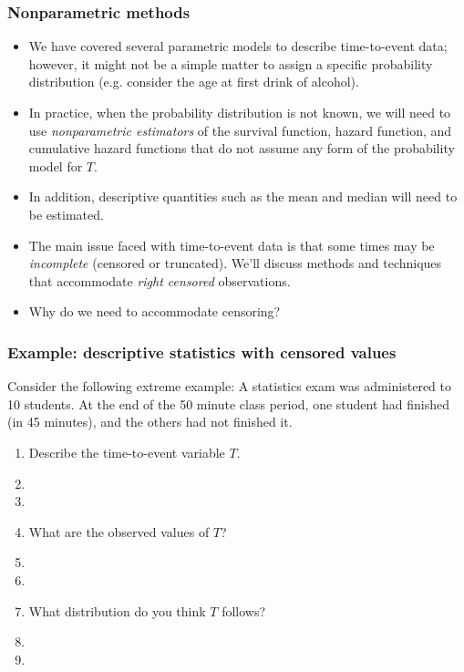 \begin{frame}
\frametitle{Nonparametric methods}
\begin{itemize}
\item We have covered several parametric models to describe time-to-event data; however, it might not be a simple matter to assign a specific probability distribution (e.g. consider the age at first drink of alcohol).

\item In practice, when the probability distribution is not known, we will need to use \textit{nonparametric estimators} of the survival function, hazard function, and cumulative hazard functions that do not assume any form of the probability model for $T$.

\item In addition, descriptive quantities such as the mean and median will need to be estimated.

\item The main issue faced with time-to-event data is that some times may be \textit{incomplete} (censored or truncated).  We'll discuss methods and techniques that accommodate \textit{right censored} observations.

\item Why do we need to accommodate censoring?


\end{itemize}
\end{frame}

\begin{frame}
\frametitle{Example: descriptive statistics with censored values}
Consider the following extreme example: A statistics exam was administered to 10 students. At the end of the 50 minute class period, one student had finished (in 45 minutes), and the others had not finished it.
\begin{enumerate}
\item Describe the time-to-event variable $T$.
\item[] %
\item[]
\item What are the observed values of $T$?
\item[] %
\item[]
\item What distribution do you think $T$ follows?
\item[]
\item[]
\end{enumerate}
\end{frame}

